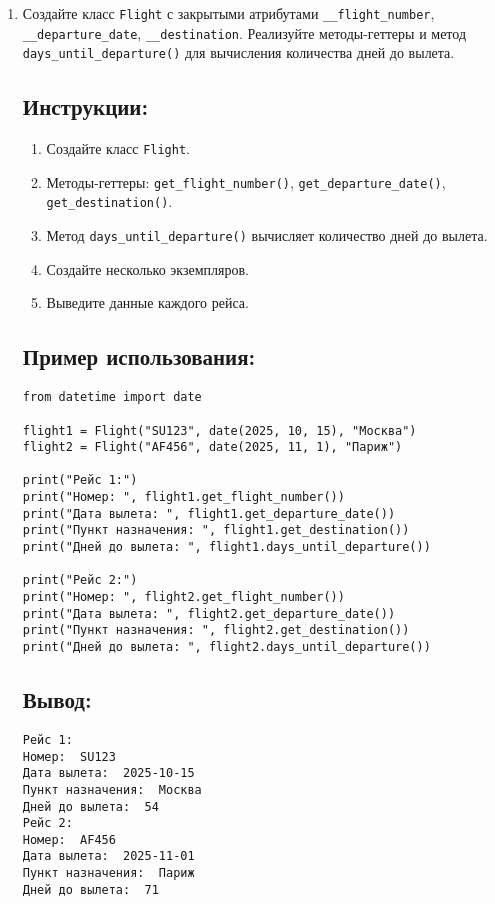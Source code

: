 \begin{enumerate}
\item
Создайте класс \texttt{Flight} с закрытыми атрибутами \texttt{\_\_flight\_number}, \texttt{\_\_departure\_date}, \texttt{\_\_destination}. Реализуйте методы-геттеры и метод \texttt{days\_until\_departure()} для вычисления количества дней до вылета.

\subsection*{Инструкции:}
\begin{enumerate}
    \item Создайте класс \texttt{Flight}.
    \item Методы-геттеры: \texttt{get\_flight\_number()}, \texttt{get\_departure\_date()}, \texttt{get\_destination()}.
    \item Метод \texttt{days\_until\_departure()} вычисляет количество дней до вылета.
    \item Создайте несколько экземпляров.
    \item Выведите данные каждого рейса.
\end{enumerate}

\subsection*{Пример использования:}
\begin{lstlisting}[caption=Пример кода]
from datetime import date

flight1 = Flight("SU123", date(2025, 10, 15), "Москва")
flight2 = Flight("AF456", date(2025, 11, 1), "Париж")

print("Рейс 1:")
print("Номер: ", flight1.get_flight_number())
print("Дата вылета: ", flight1.get_departure_date())
print("Пункт назначения: ", flight1.get_destination())
print("Дней до вылета: ", flight1.days_until_departure())

print("Рейс 2:")
print("Номер: ", flight2.get_flight_number())
print("Дата вылета: ", flight2.get_departure_date())
print("Пункт назначения: ", flight2.get_destination())
print("Дней до вылета: ", flight2.days_until_departure())
\end{lstlisting}

\subsection*{Вывод:}
\begin{lstlisting}[caption=Ожидаемый вывод]
Рейс 1:
Номер:  SU123
Дата вылета:  2025-10-15
Пункт назначения:  Москва
Дней до вылета:  54
Рейс 2:
Номер:  AF456
Дата вылета:  2025-11-01
Пункт назначения:  Париж
Дней до вылета:  71
\end{lstlisting}


\end{enumerate}
